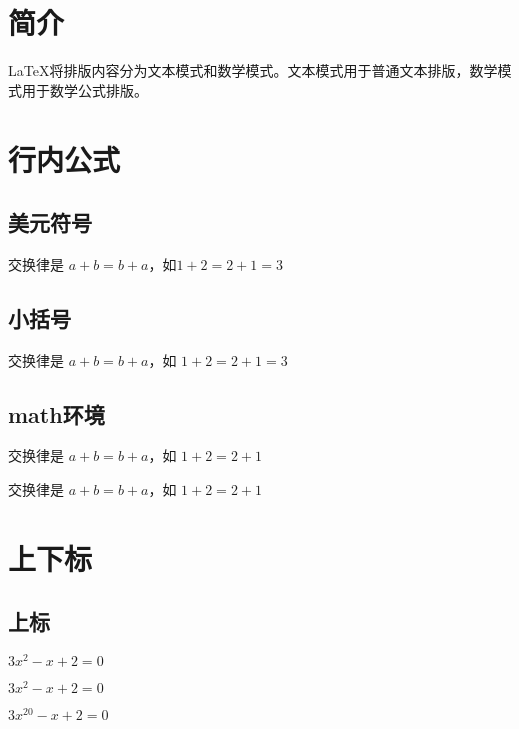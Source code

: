 \documentclass{article}
\begin{document}
	\section{简介}
	
	\LaTeX{}将排版内容分为文本模式和数学模式。文本模式用于普通文本排版，数学模式用于数学公式排版。
	
	\section{行内公式}
	\subsection{美元符号}
	
	交换律是 $a+b=b+a$，如$1+2=2+1=3$
	
	\subsection{小括号}
	
	交换律是 \(a+b=b+a\)，如 \(1+2=2+1=3\)
	\subsection{math环境}
	
	交换律是 \begin{math}
		a+b=b+a
	\end{math}，如
	\begin{math}
		1+2=2+1
	\end{math}
	
	交换律是 \begin{math}a+b=b+a\end{math}，如 \begin{math}1+2=2+1\end{math}
	
	\section{上下标}
	\subsection{上标}
	
	$3x^2 - x + 2 = 0$
	
	$3x^2-x+2=0$
	
	
	$3x^20-x+2=0$ %
	
\end{document}
